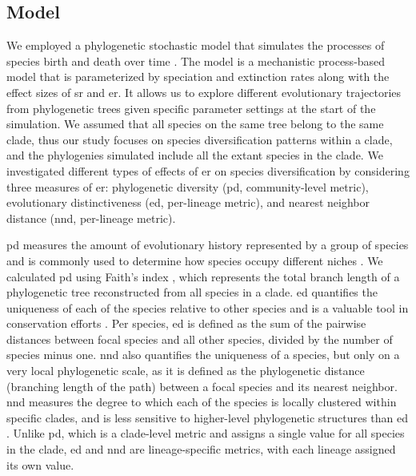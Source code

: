 {\subsection{Model} 
\label{ch1::sec::methods::model}
We employed a phylogenetic stochastic model that simulates the processes of species birth and death over time \citep{nee_extinction_1994}. The model is a mechanistic process-based model that is parameterized by speciation and extinction rates along with the effect sizes of \acrshort{sr} and \acrshort{er}. It allows us to explore different evolutionary trajectories from phylogenetic trees given specific parameter settings at the start of the simulation. We assumed that all species on the same tree belong to the same clade, thus our study focuses on species diversification patterns within a clade, and the phylogenies simulated include all the extant species in the clade. We investigated different types of effects of \acrshort{er} on species diversification by considering three measures of \acrshort{er}: phylogenetic diversity (\acrshort{pd}, community-level metric), evolutionary distinctiveness (\acrshort{ed}, per-lineage metric), and nearest neighbor distance (\acrshort{nnd}, per-lineage metric). 

\acrshort{pd} measures the amount of evolutionary history represented by a group of species and is commonly used to determine how species occupy different niches \citep{tucker_relationship_2018}. We calculated \acrshort{pd} using Faith's index \citep{faith_conservation_1992}, which represents the total branch length of a phylogenetic tree reconstructed from all species in a clade. \acrshort{ed} quantifies the uniqueness of each of the species relative to other species and is a valuable tool in conservation efforts \citep{cadotte_rarest_2010}. Per species, \acrshort{ed} is defined as the sum of the pairwise distances between focal species and all other species, divided by the number of species minus one. \acrshort{nnd} also quantifies the uniqueness of a species, but only on a very local phylogenetic scale, as it is defined as the phylogenetic distance (branching length of the path) between a focal species and its nearest neighbor. \acrshort{nnd} measures the degree to which each of the species is locally clustered within specific clades, and is less sensitive to higher-level phylogenetic structures than \acrshort{ed} \citep{webb_exploring_2000}. Unlike \acrshort{pd}, which is a clade-level metric and assigns a single value for all species in the clade, \acrshort{ed} and \acrshort{nnd} are lineage-specific metrics, with each lineage assigned its own value.

}
